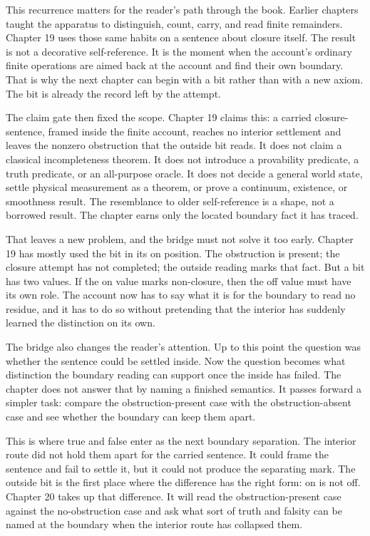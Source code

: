 This recurrence matters for the reader's path through the book. Earlier chapters taught the
apparatus to distinguish, count, carry, and read finite remainders. Chapter 19 uses those same
habits on a sentence about closure itself. The result is not a decorative self-reference. It is
the moment when the account's ordinary finite operations are aimed back at the account and find
their own boundary. That is why the next chapter can begin with a bit rather than with a new
axiom. The bit is already the record left by the attempt.

The claim gate then fixed the scope. Chapter 19 claims this: a carried closure-sentence,
framed inside the finite account, reaches no interior settlement and leaves the nonzero
obstruction that the outside bit reads. It does not claim a classical incompleteness theorem.
It does not introduce a provability predicate, a truth predicate, or an all-purpose oracle. It
does not decide a general world state, settle physical measurement as a theorem, or prove a
continuum, existence, or smoothness result. The resemblance to older self-reference is a shape,
not a borrowed result. The chapter earns only the located boundary fact it has traced.

That leaves a new problem, and the bridge must not solve it too early. Chapter 19 has mostly
used the bit in its on position. The obstruction is present; the closure attempt has not
completed; the outside reading marks that fact. But a bit has two values. If the on value marks
non-closure, then the off value must have its own role. The account now has to say what it is
for the boundary to read no residue, and it has to do so without pretending that the interior
has suddenly learned the distinction on its own.

The bridge also changes the reader's attention. Up to this point the question was whether the
sentence could be settled inside. Now the question becomes what distinction the boundary
reading can support once the inside has failed. The chapter does not answer that by naming a
finished semantics. It passes forward a simpler task: compare the obstruction-present case
with the obstruction-absent case and see whether the boundary can keep them apart.

This is where true and false enter as the next boundary separation. The interior route did not
hold them apart for the carried sentence. It could frame the sentence and fail to settle it,
but it could not produce the separating mark. The outside bit is the first place where the
difference has the right form: on is not off. Chapter 20 takes up that difference. It will
read the obstruction-present case against the no-obstruction case and ask what sort of truth
and falsity can be named at the boundary when the interior route has collapsed them.

